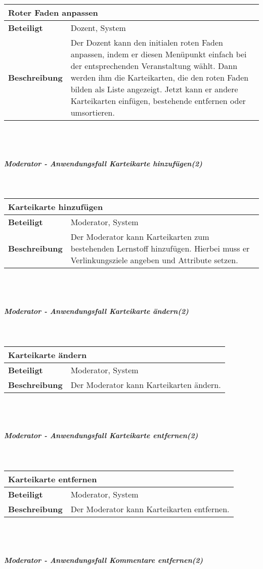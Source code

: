 \documentclass[12pt,a4paper]{article}
\begin{document}
\begin{tabular}{l p{10cm}}
\multicolumn{2}{l}{\textbf{Roter Faden anpassen}} \\ \hline
\textbf{Beteiligt} & Dozent, System \\ \hline 
\textbf{Beschreibung} & Der Dozent kann den initialen roten Faden anpassen, indem er diesen Menüpunkt einfach bei der entsprechenden Veranstaltung wählt. Dann werden ihm die Karteikarten, die den roten Faden bilden als Liste angezeigt. Jetzt kann er andere Karteikarten einfügen, bestehende entfernen oder umsortieren.\\ 
\hline 
\end{tabular}\\\\
\subparagraph{Moderator - Anwendungsfall \glqq Karteikarte hinzufügen\grqq (2)}\mbox{}\\

\begin{tabular}{l p{10cm}}
\multicolumn{2}{l}{\textbf{Karteikarte hinzufügen}} \\ \hline
\textbf{Beteiligt} & Moderator, System \\ \hline 
\textbf{Beschreibung} & Der Moderator kann Karteikarten zum bestehenden Lernstoff hinzufügen. Hierbei muss er Verlinkungsziele angeben und Attribute setzen.\\ 
\hline 
\end{tabular}\\\\
\subparagraph{Moderator - Anwendungsfall \glqq Karteikarte ändern\grqq (2)}\mbox{}\\

\begin{tabular}{l p{10cm}}
\multicolumn{2}{l}{\textbf{Karteikarte ändern}} \\ \hline
\textbf{Beteiligt} & Moderator, System \\ \hline 
\textbf{Beschreibung} & Der Moderator kann Karteikarten ändern.\\ 
\hline 
\end{tabular}\\\\
\subparagraph{Moderator - Anwendungsfall \glqq Karteikarte entfernen\grqq (2)}\mbox{}\\

\begin{tabular}{l p{10cm}}
\multicolumn{2}{l}{\textbf{Karteikarte entfernen}} \\ \hline
\textbf{Beteiligt} & Moderator, System \\ \hline 
\textbf{Beschreibung} & Der Moderator kann Karteikarten entfernen.\\ 
\hline 
\end{tabular}\\\\
\subparagraph{Moderator - Anwendungsfall \glqq Kommentare entfernen\grqq (2)}\mbox{}\\
\end{document}
